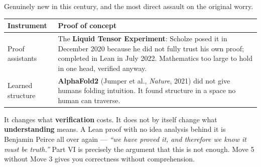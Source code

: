 \begin{movebox}[title={MOVE 5 --- Externalise the bookkeeping}]
Genuinely new in this century, and the most direct assault on the original worry.
\begin{center}\small
\begin{tabular}{@{}>{\raggedright\arraybackslash}p{4.6cm}>{\raggedright\arraybackslash}p{11.6cm}@{}}
\toprule
\rowcolor{ember!12}
\textbf{\color{ember}Instrument} & \textbf{\color{ember}Proof of concept}\\
\midrule
Proof assistants & The \textbf{Liquid Tensor Experiment}: Scholze posed it in December 2020 because he
 did not fully trust his own proof; completed in Lean in July 2022. Mathematics too large to hold in
 one head, verified anyway.\\
Learned structure & \textbf{AlphaFold2} (Jumper et al., \textit{Nature}, 2021) did not give humans
 folding intuition. It found structure in a space no human can traverse.\\
\bottomrule
\end{tabular}
\end{center}
\vspace{2pt}
\begin{critbox}[title={But be honest about what this buys}]
It changes what \textbf{verification} costs. It does not by itself change what \textbf{understanding}
means. A Lean proof with no idea analysis behind it is Benjamin Peirce all over again ---
\textit{``we have proved it, and therefore we know it must be truth.''} Part VI is precisely the
argument that this is not enough. Move 5 without Move 3 gives you correctness without comprehension.
\end{critbox}
\end{movebox}
